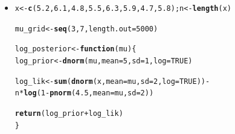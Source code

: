 \documentclass[11pt, a4paper]{article}\usepackage[]{graphicx}\usepackage[]{xcolor}
\makeatletter
\newcommand{\hlnum}[1]{\textcolor[rgb]{0.686,0.059,0.569}{#1}}%
\newcommand{\hlopt}[1]{\textcolor[rgb]{0,0,0}{#1}}%
\newcommand{\hldef}[1]{\textcolor[rgb]{0.345,0.345,0.345}{#1}}%
\newcommand{\hlkwa}[1]{\textcolor[rgb]{0.161,0.373,0.58}{\textbf{#1}}}%
\newcommand{\hlkwb}[1]{\textcolor[rgb]{0.69,0.353,0.396}{#1}}%
\newcommand{\hlkwc}[1]{\textcolor[rgb]{0.333,0.667,0.333}{#1}}%
\newcommand{\hlkwd}[1]{\textcolor[rgb]{0.737,0.353,0.396}{\textbf{#1}}}%
\newenvironment{kframe}{%
 \def\at@end@of@kframe{}%
 \ifinner\ifhmode%
  \def\at@end@of@kframe{\end{minipage}}%
  \begin{minipage}{\columnwidth}%
 \fi\fi%
 \def\FrameCommand##1{\hskip\@totalleftmargin \hskip-\fboxsep
 \colorbox{shadecolor}{##1}\hskip-\fboxsep
     \hskip-\linewidth \hskip-\@totalleftmargin \hskip\columnwidth}%
 \MakeFramed {\advance\hsize-\width
   \@totalleftmargin\z@ \linewidth\hsize
   \@setminipage}}%
 {\par\unskip\endMakeFramed%
 \at@end@of@kframe}
\newenvironment{knitrout}{}{} %
\makeatother
\begin{document}
\begin{itemize}

\item[\scalebox{2.0}{\twemoji{keycap: 2}}] \hspace{0.1cm}



\begin{knitrout}
\color{fgcolor}\begin{kframe}
\begin{alltt}
\hldef{x} \hlkwb{<-} \hlkwd{c}\hldef{(}\hlnum{5.2}\hldef{,} \hlnum{6.1}\hldef{,} \hlnum{4.8}\hldef{,} \hlnum{5.5}\hldef{,} \hlnum{6.3}\hldef{,} \hlnum{5.9}\hldef{,} \hlnum{4.7}\hldef{,} \hlnum{5.8}\hldef{); n} \hlkwb{<-} \hlkwd{length}\hldef{(x)}
\end{alltt}
\end{kframe}
\end{knitrout}

\begin{knitrout}
\color{fgcolor}\begin{kframe}
\begin{alltt}
\hldef{mu_grid} \hlkwb{<-} \hlkwd{seq}\hldef{(}\hlnum{3}\hldef{,} \hlnum{7}\hldef{,} \hlkwc{length.out} \hldef{=} \hlnum{5000}\hldef{)}
\end{alltt}
\end{kframe}
\end{knitrout}

\begin{knitrout}
\color{fgcolor}\begin{kframe}
\begin{alltt}
\hldef{log_posterior} \hlkwb{<-} \hlkwa{function}\hldef{(}\hlkwc{mu}\hldef{) \{}
  \hldef{log_prior} \hlkwb{<-} \hlkwd{dnorm}\hldef{(mu,} \hlkwc{mean} \hldef{=} \hlnum{5}\hldef{,} \hlkwc{sd} \hldef{=} \hlnum{1}\hldef{,} \hlkwc{log} \hldef{=} \hlnum{TRUE}\hldef{)}

  \hldef{log_lik} \hlkwb{<-} \hlkwd{sum}\hldef{(}\hlkwd{dnorm}\hldef{(x,} \hlkwc{mean} \hldef{= mu,} \hlkwc{sd} \hldef{=} \hlnum{2}\hldef{,} \hlkwc{log} \hldef{=} \hlnum{TRUE}\hldef{))} \hlopt{-}
             \hldef{n} \hlopt{*} \hlkwd{log}\hldef{(}\hlnum{1} \hlopt{-} \hlkwd{pnorm}\hldef{(}\hlnum{4.5}\hldef{,} \hlkwc{mean} \hldef{= mu,} \hlkwc{sd} \hldef{=} \hlnum{2}\hldef{))}

  \hlkwd{return}\hldef{(log_prior} \hlopt{+} \hldef{log_lik)}
\hldef{\}}
\end{alltt}
\end{kframe}
\end{knitrout}


\end{itemize}
\end{document}

